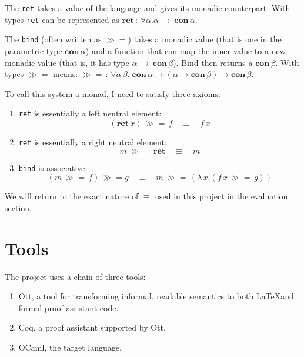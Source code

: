 \documentclass[12pt,twoside,notitlepage]{report}
\begin{document}
The \lstinline|ret| takes a value of the language and gives its monadic counterpart. With types \lstinline|ret| can be represented as $ \textbf{ret} \, :\, \forall \alpha. \alpha\, \rightarrow\, \textbf{con}\, \alpha $.

The \lstinline|bind| (often written as $ \gg= $)  takes a monadic value (that is one in the parametric type $ \textbf{con} \, \alpha $) and a function that can map the inner value to a new monadic value (that is, it has type $ \alpha \, \rightarrow \, \textbf{con} \, \beta $). Bind then returns a $ \textbf{con} \, \beta $. With types $ \gg= $ means: $ \gg= \, : \, \forall \alpha \, \beta. \; \textbf{con} \, \alpha \rightarrow (\alpha \rightarrow \textbf{con} \, \beta) \rightarrow \textbf{con} \, \beta $.

To call this system a monad, I need to satisfy three axioms:

\begin{enumerate}
\item{\lstinline|ret| is essentially a left neutral element:
\[ (\textbf{ret} \, x) \, \gg=\, f \quad \equiv \quad f \, x \]}
\item{\lstinline|ret| is essentially a right neutral element:
\[ m \, \gg=\, \textbf{ret} \quad \equiv \quad m \]}
\item{\lstinline|bind| is associative:
\[ (m \, \gg= \, f) \, \gg= g \quad \equiv \quad m\, \gg= \, (\lambda\, x. (f\, x \, \gg= \, g) ) \]}
\end{enumerate}

We will return to the exact nature of $ \equiv $ used in this project in the evaluation section.


\section{Tools}
The project uses a chain of three tools: \begin{enumerate}
\item{
Ott, a tool for transforming informal, readable semantics to both \LaTeX and formal proof assistant code.}
\item{Coq, a proof assistant supported by Ott. }
\item{OCaml, the target language. }
\end{enumerate}
\end{document}
